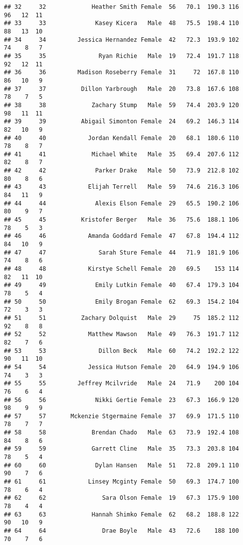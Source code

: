 \documentclass[
]{article}
\begin{document}
\begin{verbatim}
## 32     32             Heather Smith Female  56   70.1  190.3 116  96   12  11
## 33     33              Kasey Kicera   Male  48   75.5  198.4 110  88   13  10
## 34     34         Jessica Hernandez Female  42   72.3  193.9 102  74    8   7
## 35     35               Ryan Richie   Male  19   72.4  191.7 118  92   12  11
## 36     36         Madison Roseberry Female  31     72  167.8 110  86   10   9
## 37     37          Dillon Yarbrough   Male  20   73.8  167.6 108  78    7   5
## 38     38             Zachary Stump   Male  59   74.4  203.9 120  98   11  11
## 39     39          Abigail Simonton Female  24   69.2  146.3 114  82   10   9
## 40     40            Jordan Kendall Female  20   68.1  180.6 110  78    8   7
## 41     41             Michael White   Male  35   69.4  207.6 112  82    8   7
## 42     42              Parker Drake   Male  50   73.9  212.8 102  80    8   6
## 43     43            Elijah Terrell   Male  59   74.6  216.3 106  84   11   9
## 44     44              Alexis Elson Female  29   65.5  190.2 106  80    9   7
## 45     45          Kristofer Berger   Male  36   75.6  188.1 106  78    5   3
## 46     46            Amanda Goddard Female  47   67.8  194.4 112  84   10   9
## 47     47               Sarah Sture Female  44   71.9  181.9 106  74    8   6
## 48     48            Kirstye Schell Female  20   69.5    153 114  82   11  10
## 49     49              Emily Lutkin Female  40   67.4  179.3 104  78    5   4
## 50     50              Emily Brogan Female  62   69.3  154.2 104  72    3   3
## 51     51          Zachary Dolquist   Male  29     75  185.2 112  92    8   8
## 52     52            Matthew Mawson   Male  49   76.3  191.7 112  82    7   6
## 53     53               Dillon Beck   Male  60   74.2  192.2 122  90   11  10
## 54     54            Jessica Hutson Female  20   64.9  194.9 106  74    3   3
## 55     55         Jeffrey Mcilvride   Male  24   71.9    200 104  76    6   4
## 56     56              Nikki Gertie Female  23   67.3  166.9 120  98    9   9
## 57     57       Mckenzie Stgermaine Female  37   69.9  171.5 110  78    7   7
## 58     58             Brendan Chado   Male  63   73.9  192.4 108  84    8   6
## 59     59             Garrett Cline   Male  35   73.3  203.8 104  78    5   4
## 60     60              Dylan Hansen   Male  51   72.8  209.1 110  90    7   6
## 61     61            Linsey Mcginty Female  50   69.3  174.7 100  78    6   4
## 62     62                Sara Olson Female  19   67.3  175.9 100  78    4   4
## 63     63             Hannah Shimko Female  62   68.2  188.8 122  90   10   9
## 64     64                Drae Boyle   Male  43   72.6    188 100  70    7   6

\end{verbatim}
\end{document}

